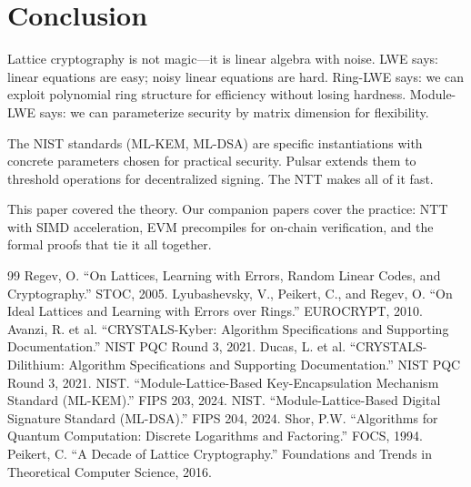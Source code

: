 \section{Conclusion}


Lattice cryptography is not magic---it is linear algebra with noise. LWE says: linear
equations are easy; noisy linear equations are hard. Ring-LWE says: we can exploit
polynomial ring structure for efficiency without losing hardness. Module-LWE says: we
can parameterize security by matrix dimension for flexibility.

The NIST standards (ML-KEM, ML-DSA) are specific instantiations with concrete parameters
chosen for practical security. Pulsar extends them to threshold operations for
decentralized signing. The NTT makes all of it fast.

This paper covered the theory. Our companion papers cover the practice: NTT with SIMD
acceleration, EVM precompiles for on-chain verification, and the formal proofs that
tie it all together.

\begin{thebibliography}{99}
 Regev, O. ``On Lattices, Learning with Errors, Random Linear Codes, and Cryptography.'' STOC, 2005.
 Lyubashevsky, V., Peikert, C., and Regev, O. ``On Ideal Lattices and Learning with Errors over Rings.'' EUROCRYPT, 2010.
 Avanzi, R. et al. ``CRYSTALS-Kyber: Algorithm Specifications and Supporting Documentation.'' NIST PQC Round 3, 2021.
 Ducas, L. et al. ``CRYSTALS-Dilithium: Algorithm Specifications and Supporting Documentation.'' NIST PQC Round 3, 2021.
 NIST. ``Module-Lattice-Based Key-Encapsulation Mechanism Standard (ML-KEM).'' FIPS 203, 2024.
 NIST. ``Module-Lattice-Based Digital Signature Standard (ML-DSA).'' FIPS 204, 2024.
 Shor, P.W. ``Algorithms for Quantum Computation: Discrete Logarithms and Factoring.'' FOCS, 1994.
 Peikert, C. ``A Decade of Lattice Cryptography.'' Foundations and Trends in Theoretical Computer Science, 2016.
\end{thebibliography}

